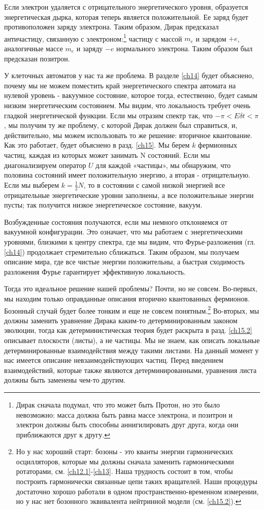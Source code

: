 \documentclass[main.tex]{subfiles}
\begin{document}
Если электрон удаляется с отрицательного энергетического уровня, образуется энергетическая дырка, которая теперь является положительной. Ее заряд будет противоположен заряду электрона. Таким образом, Дирак предсказал античастицу, связанную с электроном:\footnote{Дирак сначала подумал, что это может быть Протон, но это было невозможно: масса должна быть равна массе электрона, и позитрон и электрон должны быть способны аннигилировать друг друга, когда они приближаются друг к другу.} частицу с массой $m_e$ и зарядом $+e$, аналогичные массе $m_e$ и заряду $-e$ нормального электрона. Таким образом был предсказан позитрон.

У клеточных автоматов у нас та же проблема. В разделе \ref{ch14} будет объяснено, почему мы не можем поместить край энергетического спектра автомата на нулевой уровень - вакуумное состояние, которое тогда, естественно, будет самым низким энергетическим состоянием. Мы видим, что локальность требует очень гладкой энергетической функции. Если мы отразим спектр так, что $-\pi < E\delta t < \pi$, мы получим ту же проблему, с которой Дирак должен был справиться, и, действительно, мы можем использовать то же решение: вторичное квантование. Как это работает, будет объяснено в разд. \ref{ch15}. Мы берем $k$ фермионных частиц, каждая из которых может занимать N состояний. Если мы диагонализируем оператор $U$ для каждой «частицы», мы обнаружим, что половина состояний имеет положительную энергию, а вторая - отрицательную. Если мы выберем $k = \frac 1 2 N$, то в состоянии с самой низкой энергией все отрицательные энергетические уровни заполнены, а все положительные энергии пусты; так получится низкое энергетическое состояние, вакуум.

Возбужденные состояния получаются, если мы немного отклоняемся от вакуумной конфигурации. Это означает, что мы работаем с энергетическими уровнями, близкими к центру спектра, где мы видим, что Фурье-разложения (гл.\ref{ch14}) продолжает стремительно сближаться. Таким образом, мы получаем описание мира, где все чистые энергии положительны, а быстрая сходимость разложения Фурье гарантирует эффективную локальность.

Тогда это идеальное решение нашей проблемы? Почти, но не совсем. Во-первых, мы находим только оправданные описания вторично квантованных фермионов. Бозонный случай будет более тонким и еще не совсем понятным.\footnote{Но у нас хороший старт: бозоны - это кванты энергии гармонических осцилляторов, которые мы должны сначала заменить гармоническими ротаторами, см. \ref{ch12.1}-\ref{ch13}. Наша трудность состоит в том, чтобы построить гармонически связанные цепи таких вращателей. Наши процедуры достаточно хорошо работали в одном пространственно-временном измерении, но у нас нет бозонного эквивалента нейтринной модели (см. \ref{ch15.2}).} Во-вторых, мы должны заменить уравнение Дирака каким-то детерминированным законом эволюции, тогда как детерминистическая теория будет раскрыта в разд. \ref{ch15.2} описывает плоскости (листы), а не частицы. Мы не знаем, как описать локальные детерминированные взаимодействия между такими листами. На данный момент у нас имеется описание невзаимодействующих частиц. Перед введением взаимодействий, которые также являются детерминированными, уравнения листа должны быть заменены чем-то другим.
\end{document}
